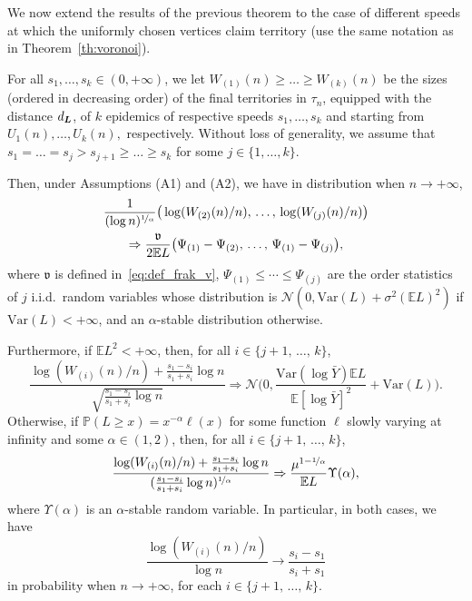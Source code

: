 \documentclass[AHL,Unicode,longabstracts,published]{cedram}
\newcommand{\bs}{\ensuremath{\boldsymbol}}
\newcommand{\bbP}{\mathbb{P}}
\newcommand{\bbE}{\mathbb{E}}
\newcommand{\clN}{\mathcal{N}}
\newcommand{\Var}{\mathrm{Var}}
\newcommand{\frkv}{\mathfrak{v}}
\begin{document}
We now extend the results of the previous theorem to the case of different speeds at which the uniformly chosen vertices claim territory (use the same notation as in Theorem~\ref{th:voronoi}).

\begin{theo}\label{th:territories}
For all $s_1, \ldots, s_k\in (0,+\infty)$, we let $W_{(1)}(n)\geq \ldots \geq W_{(k)}(n)$ be the sizes (ordered in decreasing order) of the final territories in $\tau_n$, equipped with the distance $d_{\bs L}$, of $k$ epidemics of respective speeds $s_1, \ldots, s_k$ and starting from $U_1(n), \ldots, U_k(n),$ respectively. Without loss of generality, we assume that $s_1 = \ldots = s_j > s_{j+1} \geq \ldots\geq s_k$ for some $j\in\{1,\dots,k\}$.

Then, under Assumptions {\rm (A1)} and {\rm (A2)}, we have in distribution when $n\to+\infty$,
\begin{multline}\label{eq:terPrincipalConv}
\frac1{(\log n)^{\nicefrac1\alpha}}\big(\log (W_{(2)}(n)/n), \,\ldots,\, \log (W_{(j)}(n)/n)\big)\\
\Rightarrow\frac{\frkv}{2\bbE L}
\big(\Psi_{(1)}-\Psi_{(2)}, \,\ldots,\, \Psi_{(1)}-\Psi_{(j)}\big),
\end{multline}
where $\frkv$ is defined in~\eqref{eq:def_frak_v}, $\Psi_{(1)}\leq \cdots\leq \Psi_{(j)}$ are the order statistics of $j$ i.i.d.\ random variables whose distribution is $\clN(0, \Var(L) + \sigma^2 (\bbE L)^2)$ if $\Var(L)<+\infty$, and an $\alpha$-stable distribution otherwise.

Furthermore, if $\bbE L^2<+\infty$, then, for all $i \in \{j+1, \,\ldots,\, k\}$,
\[
\frac{\log(W_{(i)}(n)/n) + \frac{s_1-s_i}{s_1+s_i}\log n}{\sqrt{\frac{s_1-s_i}{s_1+s_i}\log n}}
\Rightarrow \clN\bigg(0, \frac{\Var(\log \bar Y)\bbE L}{\bbE[\log\bar Y]^2}+\Var(L)\bigg).
\]
Otherwise, if $\bbP(L\geq x) = x^{-\alpha}\ell(x)$ for some function $\ell$ slowly varying at infinity and some $\alpha\in(1,2)$, then, for all $i \in \{j+1, \,\ldots,\, k\}$,
\[
\frac{\log (W_{(i)}(n)/n)+\frac{s_1-s_i}{s_1+s_i} \log n}{(\frac{s_1-s_i}{s_1+s_i} \log n)^{\nicefrac1\alpha}}
\Rightarrow \frac{\mu^{1-\nicefrac1\alpha}}{\bbE L}\Upsilon(\alpha),
\]
where $\Upsilon(\alpha)$ is an $\alpha$-stable random variable. In particular, in both cases, we have
\begin{equation}\label{eq:terMinorConv}
\frac{\log(W_{(i)}(n)/n)}{\log n} \to \frac{s_i-s_1}{s_i+s_1}
\end{equation}
in probability when $n\to+\infty$, for each $i \in \{j+1,\,\ldots,\, k\}$.
\end{theo}
\end{document}
